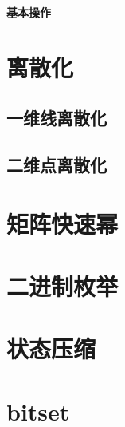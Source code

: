 \documentclass{article}
\begin{document}
\begin{titlepage}

\thispagestyle{empty}
\pagebreak
\textbf{基本操作}
\pagestyle{plain}
\tableofcontents
\end{titlepage}


\hspace{3em}
\section{﻿离散化}
\subsection{一维线离散化}

\subsection{二维点离散化}


\section{矩阵快速幂}


\section{二进制枚举}


\section{状态压缩}


\section{bitset}

\end{document}
